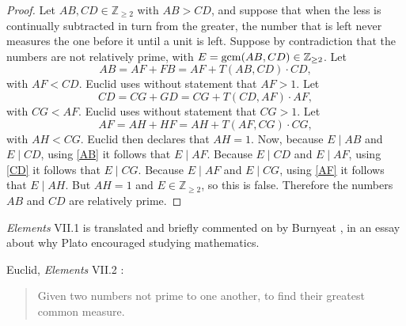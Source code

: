 \documentclass{article}
\newcommand{\gcm}{\ensuremath\mathrm{gcm}}
\begin{document}
\begin{proof}
Let $AB,CD \in \mathbb{Z}_{\geq 2}$ with $AB>CD$, 
and suppose that when the less is continually subtracted in turn from the greater, the number that is left
never measures the one before it until a unit is left.
Suppose by contradiction
that the numbers are not relatively prime, with $E=\gcm(AB,CD) \in \mathbb{Z}_{\geq 2}$. 
Let
\begin{equation}
AB = AF+FB = AF + T(AB,CD) \cdot CD,
\label{AB}
\end{equation}
with $AF<CD$. Euclid uses without statement that $AF>1$.
Let
\begin{equation}
CD = CG+GD = CG + T(CD,AF) \cdot AF,
\label{CD}
\end{equation}
with $CG<AF$. Euclid uses without statement that $CG>1$.
Let
\begin{equation}
AF = AH + HF = AH + T(AF,CG) \cdot CG,
\label{AF}
\end{equation}
with $AH<CG$. Euclid then declares that $AH=1$. 
Now, because $E \mid AB$ and $E \mid CD$, using
\eqref{AB}
it follows that
$E \mid AF$. 
Because $E \mid CD$ and $E \mid AF$, using
\eqref{CD} it follows that
$E \mid CG$. 
Because $E \mid AF$ and $E \mid CG$, using 
\eqref{AF} it follows that
$E \mid AH$. But $AH=1$ and $E \in \mathbb{Z}_{\geq 2}$,  so this is false.
Therefore the numbers $AB$ and $CD$ are relatively prime.
\end{proof}

{\em Elements} VII.1 is translated and briefly commented on by Burnyeat \cite[pp.~29--31]{burnyeat}, in an essay about why 
Plato encouraged studying mathematics.



Euclid, {\em Elements} VII.2 \cite[p.~298]{euclidII}:

\begin{quote}
Given two numbers not prime to one another, to find their
greatest common measure.
\end{quote}
\end{document}
